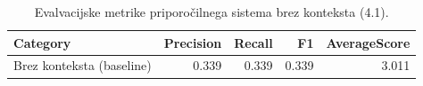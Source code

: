 \begin{table}[h]
\centering
\caption{Evalvacijske metrike priporočilnega sistema brez konteksta (4.1).}
\label{tab:evaluation_metrics_4_1}
\begin{tabular}{lrrrr}
\toprule
Category & Precision & Recall & F1 & AverageScore \\
\midrule
Brez konteksta (baseline) & 0.339 & 0.339 & 0.339 & 3.011 \\
\bottomrule
\end{tabular}

\end{table}
